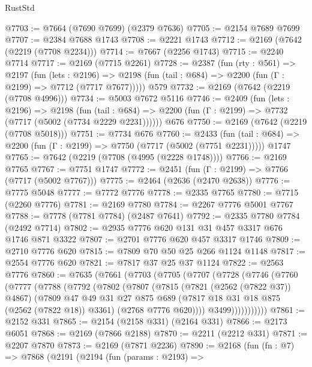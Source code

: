 \begin{lexlean}{RustStd}
\begin{coremodule}
@7703 := @7664 (@7690 @7699) (@2379 @7636)
@7705 := @2154 @7689 @7699
@7707 := @2384 @7688 @1743
@7708 := @2221 @1743
@7712 := @2169 (@7642 (@2219 (@7708 @2234)))
@7714 := @7667 (@2256 @1743)
@7715 := @2240 @7714
@7717 := @2169 (@7715 @2261)
@7728 := @2387
    (fun (rty : @561) =>
    @2197
      (fun (lets : @2196) =>
      @2198 (fun (tail : @684) => @2200 (fun (Γ : @2199) => @7712 (@7717 @7677)))))
    @579
@7732 := @2169 (@7642 (@2219 (@7708 @4996)))
@7734 := @5003 @7672 @5116
@7746 := @2409
    (fun (lets : @2196) =>
    @2198
      (fun (tail : @684) => @2200 (fun (Γ : @2199) => @7732 (@7717 (@5002 (@7734 @2229 @2231))))))
    @676
@7750 := @2169 (@7642 (@2219 (@7708 @5018)))
@7751 := @7734 @676
@7760 := @2433
    (fun (tail : @684) => @2200 (fun (Γ : @2199) => @7750 (@7717 (@5002 (@7751 @2231)))))
    @1747
@7765 := @7642 (@2219 (@7708 (@4995 (@2228 @1748))))
@7766 := @2169 @7765
@7767 := @7751 @1747
@7772 := @2451 (fun (Γ : @2199) => @7766 (@7717 (@5002 @7767)))
@7775 := @2464 (@2636 (@2470 @2638))
@7776 := @7775 @5048
@7777 := @7772 @7776
@7778 := @2335 @7765
@7780 := @7715 (@2260 @7776)
@7781 := @2169 @7780
@7784 := @2267 @7776 @5001 @7767
@7788 := @7778 (@7781 @7784) (@2487 @7641)
@7792 := @2335 @7780 @7784 (@2492 @7714)
@7802 := @2935 @7776 @620 @131 @31 @457 @3317 @676 @1746 @871 @3322
@7807 := @2701 @7776 @620 @457 @3317 @1746
@7809 := @2710 @7776 @620
@7815 := @7809 @70 @50 @25 @266 @1124 @1148
@7817 := @2554 @7776 @620
@7821 := @7817 @37 @25 @37 @1124
@7822 := @2563 @7776
@7860 := @7635
    (@7661
      (@7703
        (@7705
          (@7707
            (@7728
              (@7746
                (@7760
                  (@7777
                    (@7788
                      (@7792
                        (@7802
                          (@7807
                            (@7815
                              (@7821 (@2562 (@7822 @37)) @4867)
                              (@7809
                                @47
                                @49
                                @31
                                @27
                                @875
                                @689
                                (@7817 @18 @31 @18 @875 (@2562 (@7822 @18)) @3361)
                                (@2768 @7776 @620))))
                          @3499)))))))))))
@7861 := @2152 @331
@7865 := @2154 (@2158 @331) (@2164 @331)
@7866 := @2173 @6051
@7868 := @2169 (@7866 @2188)
@7870 := @2211 (@2212 @331)
@7871 := @2207 @7870
@7873 := @2169 (@7871 @2236)
@7890 := @2168
    (fun (fn : @7) =>
    @7868
      (@2191
        (@2194
          (fun (params : @2193) =>

\end{coremodule}
\end{lexlean}
